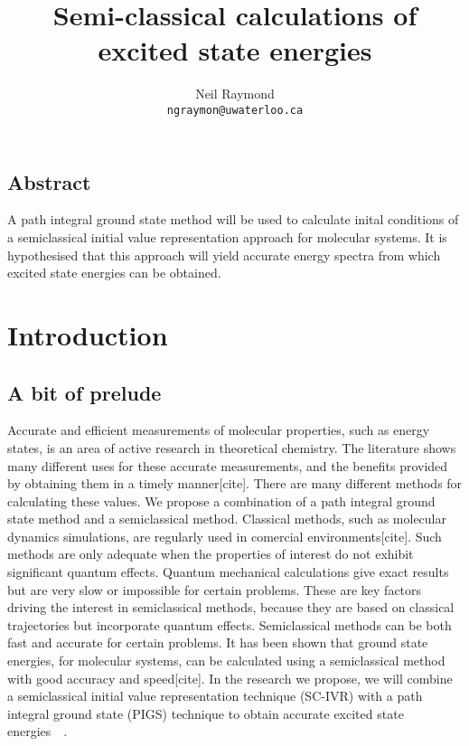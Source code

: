 \documentclass[12pt,letterpaper,oneside,final,titlepage]{article}               %
\numberwithin{equation}{section} %
\begin{document}
    \title{Semi-classical calculations of excited state energies}
    \author{Neil Raymond
           \\ \texttt{ngraymon@uwaterloo.ca}}
    \date{}
    \maketitle

\doublespacing

\subsection*{Abstract}
A path integral ground state method will be used to calculate inital conditions of a semiclassical initial value representation approach for molecular systems. 
It is hypothesised that this approach will yield accurate energy spectra from which excited state energies can be obtained. 

\section{Introduction}

\subsection{A bit of prelude}
Accurate and efficient measurements of molecular properties, such as energy states, is an area of active research in theoretical chemistry. 
The literature shows many different uses for these accurate measurements, and the benefits provided by obtaining them in a timely manner[cite]. 
There are many different methods for calculating these values. 
We propose a combination of a path integral ground state method and a semiclassical method. 
Classical methods, such as molecular dynamics simulations, are regularly used in comercial environments[cite]. 
Such methods are only adequate when the properties of interest do not exhibit significant quantum effects. 
Quantum mechanical calculations give exact results but are very slow or impossible for certain problems. 
These are key factors driving the interest in semiclassical methods, because they are based on classical trajectories but incorporate quantum effects. 
Semiclassical methods can be both fast and accurate for certain problems. 
It has been shown that ground state energies, for molecular systems, can be calculated using a semiclassical method with good accuracy and speed[cite]. 
In the research we propose, we will combine a semiclassical initial value representation technique (SC-IVR) with a path integral 
ground state (PIGS) technique to obtain accurate excited state energies~\cite{issack2007semiclassical}~\cite{schmidt2014inclusion}.
\end{document}
